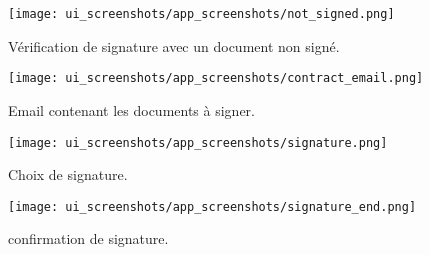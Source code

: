 \vspace{.5cm}
\begin{multicols}{2}
    \begin{figure}[H]
        \centering
        \texttt{[image: ui\_screenshots/app\_screenshots/not\_signed.png]}
        \captionsetup{justification=centering}
        \caption{Vérification de signature avec un document non signé.}
        \label{fig:not_signed}
    \end{figure}
    \begin{figure}[H]
        \centering
        \texttt{[image: ui\_screenshots/app\_screenshots/contract\_email.png]}
        \captionsetup{justification=centering}
        \caption{Email contenant les documents à signer.}
        \label{fig:sign_documents}
    \end{figure}
\end{multicols}
\vspace{.5cm}
\begin{multicols}{2}
    \begin{figure}[H]
        \centering
        \texttt{[image: ui\_screenshots/app\_screenshots/signature.png]}
        \captionsetup{justification=centering}
        \caption{Choix de signature.}
        \label{fig:signature_select}
    \end{figure}
    \begin{figure}[H]
        \centering
        \texttt{[image: ui\_screenshots/app\_screenshots/signature\_end.png]}
        \captionsetup{justification=centering}
        \caption{confirmation de signature.}
        \label{fig:confirm_sig}
    \end{figure}
\end{multicols}
